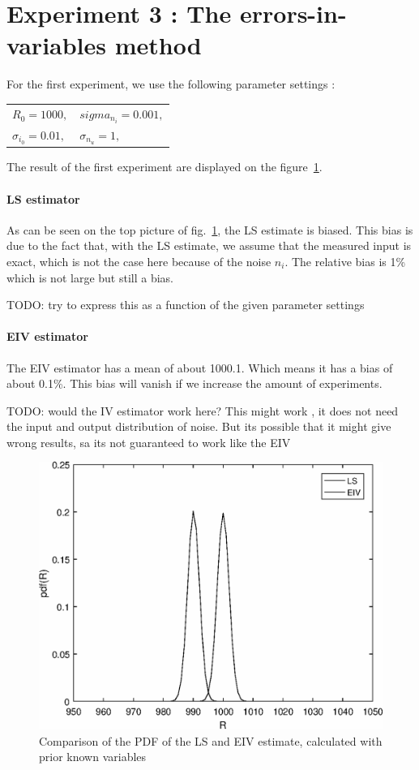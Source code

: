 \section{Experiment 3 : The errors-in-variables method}
For the first experiment, we use the following parameter settings : 

\begin{table}[h]
\centering
\begin{tabular}{ll}
    $ R_0 = 1000, $  &  $ sigma_{n_i} = 0.001, $   \\
    $ \sigma_{i_0} = 0.01, $  &  $ \sigma_{n_u} = 1, $   \\
\end{tabular}
\end{table}
The result of the first experiment are displayed on the figure~\ref{Sess1_part1_exp1}.

\paragraph{LS estimator} As can be seen on the top picture of fig.~\ref{Sess1_part1_exp1}, the LS estimate is biased. This bias is due to the fact that, with the LS estimate, we assume that the measured input is exact, which is not the case here because of the noise $n_i$. The relative bias is 1\% which is not large but still a bias.

TODO: try to express this as a function of the given parameter settings

\paragraph{EIV estimator} The EIV estimator has a mean of about 1000.1. Which means it has a bias of about 0.1\%. This bias will vanish if we increase the amount of experiments.

TODO: would the IV estimator work here? This might work , it does not need the input and output distribution of noise. But its possible that it might give wrong results, sa its not guaranteed to work like the EIV

\begin{figure}[H]
    \centering
    \includegraphics[width=1\textwidth]{Figures/Sess1_part2.eps}
    \caption{Comparison of the PDF of the LS and EIV estimate, calculated with prior known variables}
    \label{Sess1_part1_exp1}
\end{figure}


